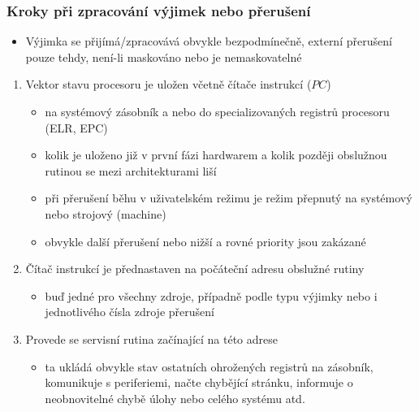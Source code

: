 \documentclass{beamer}
\begin{document}
\begin{frame}
\frametitle{Kroky při zpracování výjimek nebo přerušení}

\begin{itemize}
 \item Výjimka se přijímá/zpracovává obvykle bezpodmínečně,
externí přerušení pouze tehdy, není-li maskováno nebo je nemaskovatelné
\end{itemize}

\begin{enumerate}
 \item Vektor stavu procesoru je uložen včetně čítače instrukcí ($PC$)
 \begin{itemize}
  \item na systémový zásobník a nebo do specializovaných registrů procesoru (ELR, EPC)
  \item kolik je uloženo již v první fázi hardwarem a kolik později obslužnou rutinou se mezi architekturami liší
  \item při přerušení běhu v uživatelském režimu je režim přepnutý na systémový nebo strojový (machine)
  \item obvykle další přerušení nebo nižší a rovné priority jsou zakázané
 \end{itemize}
 \item Čítač instrukcí je přednastaven na počáteční adresu obslužné rutiny
 \begin{itemize}
  \item buď jedné pro všechny zdroje, případně podle typu výjimky nebo i jednotlivého čísla zdroje přerušení
 \end{itemize}
 \item Provede se servisní rutina začínající na této adrese
 \begin{itemize}
  \item ta ukládá obvykle stav ostatních ohrožených registrů na zásobník, komunikuje s periferiemi,
        načte chybějící stránku, informuje o neobnovitelné chybě úlohy nebo celého systému atd.
 \end{itemize}
\end{enumerate}
\end{frame}
\end{document}
